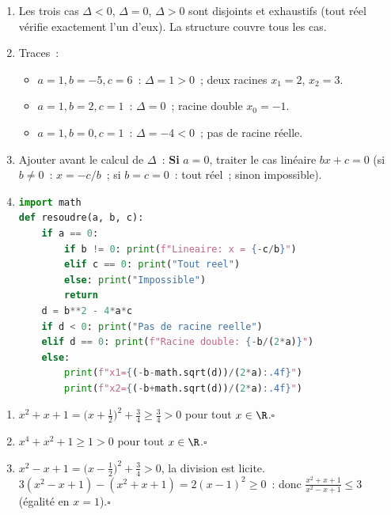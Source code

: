 \begin{enumerate}
  \item Les trois cas $\Delta<0$, $\Delta=0$, $\Delta>0$ sont disjoints et exhaustifs
        (tout r\'eel v\'erifie exactement l'un d'eux). La structure couvre tous les cas.\checkmark
  \item Traces~:
  \begin{itemize}
    \item $a=1,b=-5,c=6$~: $\Delta=1>0$~; deux racines $x_1=2$, $x_2=3$.
    \item $a=1,b=2,c=1$~: $\Delta=0$~; racine double $x_0=-1$.
    \item $a=1,b=0,c=1$~: $\Delta=-4<0$~; pas de racine r\'eelle.
  \end{itemize}
  \item Ajouter avant le calcul de $\Delta$~: \textbf{Si} $a=0$, traiter le cas lin\'eaire
        $bx+c=0$ (si $b\ne0$~: $x=-c/b$~; si $b=c=0$~: tout r\'eel~; sinon impossible).
  \item
\begin{lstlisting}[language=Python]
import math
def resoudre(a, b, c):
    if a == 0:
        if b != 0: print(f"Lineaire: x = {-c/b}")
        elif c == 0: print("Tout reel")
        else: print("Impossible")
        return
    d = b**2 - 4*a*c
    if d < 0: print("Pas de racine reelle")
    elif d == 0: print(f"Racine double: {-b/(2*a)}")
    else:
        print(f"x1={(-b-math.sqrt(d))/(2*a):.4f}")
        print(f"x2={(-b+math.sqrt(d))/(2*a):.4f}")
\end{lstlisting}
\end{enumerate}


\begin{enumerate}
  \item $x^2+x+1=\bigl(x+\tfrac{1}{2}\bigr)^2+\tfrac{3}{4}\geq\tfrac{3}{4}>0$
        pour tout $x\in\R$.\hfill$\square$
  \item $x^4+x^2+1\geq1>0$ pour tout $x\in\R$.\hfill$\square$
  \item $x^2-x+1=\bigl(x-\tfrac{1}{2}\bigr)^2+\tfrac{3}{4}>0$, la division est licite.
        $3(x^2-x+1)-(x^2+x+1)=2(x-1)^2\geq0$~:
        donc $\frac{x^2+x+1}{x^2-x+1}\leq3$ (\'egalit\'e en $x=1$).\hfill$\square$
\end{enumerate}


